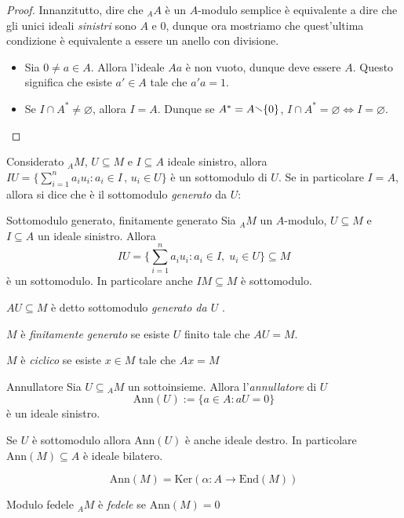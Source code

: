 \begin{proof}
    Innanzitutto, dire che \({}_AA\) è un \(A\)-modulo semplice è equivalente a
    dire che gli unici ideali \emph{sinistri} sono \(A\) e \(0\), dunque ora
    mostriamo che quest'ultima condizione è equivalente a essere un anello con
    divisione.
\begin{itemize}
    \item[\(\implies \)] Sia \(0 \neq a \in A\). Allora l'ideale \(Aa\) è non
        vuoto, dunque deve essere \(A\). Questo significa che esiste \(a' \in
        A\) tale che \(a'a =1\).
    \item[\(\impliedby \)] Se \(I \cap A^* \neq \varnothing\), allora \(I = A\).
        Dunque se \(A^* = A \sminus \{0\}\), \(I \cap A^* = \varnothing \iff I =
        \varnothing\).
\end{itemize}
\end{proof}

Considerato \({}_AM\), \(U \subseteq M \) e \(I \subseteq A \) ideale sinistro,
allora \(IU = \{\sum_{i=1}^{n} a_{i}u_{i}: a_{i} \in I \,,\, u_{i} \in U\} \) è
un sottomodulo di \(U\). Se in particolare \(I = A\), allora si dice che è il
sottomodulo \emph{generato} da \(U\): 

\begin{definition}{Sottomodulo generato, finitamente generato}
    Sia \(_AM\) un \(A\)-modulo, \(U \subseteq M \) e \(I \subseteq A\) un
    ideale sinistro. Allora
        \[
          IU = \{\sum_{i=1}^{n} a_{i} u_{i} : a_{i} \in I, \; u_{i} \in U \}
          \subseteq M 
        \]
    è un sottomodulo. In particolare anche \(IM \subseteq M \) è sottomodulo.

    \(AU \subseteq M \) è detto sottomodulo \emph{generato da \(U\) }.

    \(M\) è \emph{finitamente generato} se esiste \(U\) finito tale che \(AU =
    M\).

    \(M\) è \emph{ciclico} se esiste \(x \in M\) tale che \(Ax = M\) 
\end{definition}

\begin{definition}{Annullatore}
    Sia \(U \subseteq {}_AM \) un sottoinsieme. Allora l'\emph{annullatore} di
    \(U\) 
        \[
            \mathrm{Ann}{(U)} := \{a \in A: aU = 0\} 
        \]
    è un ideale sinistro. 
\end{definition}
\begin{remark}{}
    Se \(U\) è sottomodulo allora \(\mathrm{Ann}{(U)}\) è anche ideale destro.
    In particolare \(\mathrm{Ann}{(M)} \subseteq A\) è ideale bilatero.
\end{remark}
\begin{note}{}
        \[
          \mathrm{Ann}{(M)} = \mathrm{Ker}{(\alpha : A \to \mathrm{End}{(M)})}
        \]
\end{note}
\begin{definition}{Modulo fedele}
    \({}_AM\) è \emph{fedele} se \(\mathrm{Ann}{(M)} = 0\) 
\end{definition}

